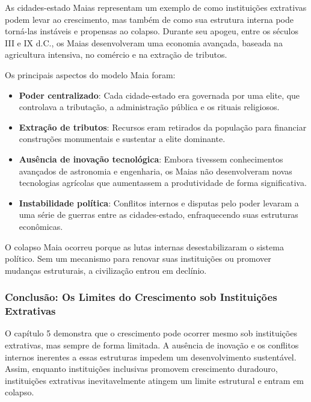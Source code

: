 \documentclass[a4paper,12pt]{article}[abntex2]
\begin{document}
As cidades-estado Maias representam um exemplo de como instituições extrativas podem levar ao crescimento, mas também de como sua estrutura interna pode torná-las instáveis e propensas ao colapso. Durante seu apogeu, entre os séculos III e IX d.C., os Maias desenvolveram uma economia avançada, baseada na agricultura intensiva, no comércio e na extração de tributos.

Os principais aspectos do modelo Maia foram:

\begin{itemize}
    \item \textbf{Poder centralizado}: Cada cidade-estado era governada por uma elite, que controlava a tributação, a administração pública e os rituais religiosos.
    
    \item \textbf{Extração de tributos}: Recursos eram retirados da população para financiar construções monumentais e sustentar a elite dominante.
    
    \item \textbf{Ausência de inovação tecnológica}: Embora tivessem conhecimentos avançados de astronomia e engenharia, os Maias não desenvolveram novas tecnologias agrícolas que aumentassem a produtividade de forma significativa.
    
    \item \textbf{Instabilidade política}: Conflitos internos e disputas pelo poder levaram a uma série de guerras entre as cidades-estado, enfraquecendo suas estruturas econômicas.
\end{itemize}

O colapso Maia ocorreu porque as lutas internas desestabilizaram o sistema político. Sem um mecanismo para renovar suas instituições ou promover mudanças estruturais, a civilização entrou em declínio.

\subsubsection{\textbf{Conclusão: Os Limites do Crescimento sob Instituições Extrativas}}

O capítulo 5 demonstra que o crescimento pode ocorrer mesmo sob instituições extrativas, mas sempre de forma limitada. A ausência de inovação e os conflitos internos inerentes a essas estruturas impedem um desenvolvimento sustentável. Assim, enquanto instituições inclusivas promovem crescimento duradouro, instituições extrativas inevitavelmente atingem um limite estrutural e entram em colapso.
\end{document}
